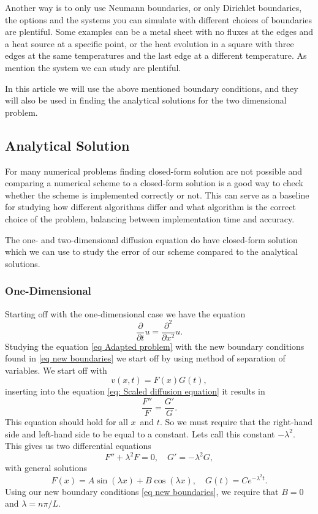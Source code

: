 \documentclass[%
reprint,
nofootinbib,
amsmath,amssymb,
aps,
]{revtex4-1}
\newcommand{\fracpt}{\frac{\partial}{\partial t}}
\newcommand{\fracpxx}{\frac{\partial^2}{\partial x^2}}
\begin{document}
Another way is to only use Neumann boundaries, or only Dirichlet boundaries, the options and the systems you can simulate with different choices of boundaries are plentiful. Some examples can be a metal sheet with no fluxes at the edges and a heat source at a specific point, or the heat evolution in a square with three edges at the same temperatures and the last edge at a different temperature. As mention the system we can study are plentiful. 

In this article we will use the above mentioned boundary conditions, and they will also be used in finding the analytical solutions for the two dimensional problem. 


\subsection{Analytical Solution}
For many numerical problems finding closed-form solution are not possible and comparing a numerical scheme to a closed-form solution is a good way to check whether the scheme is implemented correctly or not. This can serve as a baseline for studying how different algorithms differ and what algorithm is the correct choice of the problem, balancing between implementation time and accuracy. 

The one- and two-dimensional diffusion equation do have closed-form solution which we can use to study the error of our scheme compared to the analytical solutions. 
\subsubsection{One-Dimensional}
Starting off with the one-dimensional case we have the equation 
\begin{equation}
	\fracpt u = \fracpxx u. 
\end{equation}
Studying the equation \eqref{eq Adapted problem} with the new boundary conditions found in \ref{eq new boundaries} we start off by using method of separation of variables. We start off with 
\begin{equation}
	v(x,t) = F(x)G(t),
\end{equation}
inserting into the equation \eqref{eq: Scaled diffusion equation} it results in 
\begin{equation}
	\frac{F''}{F} = \frac{G'}{G}.
\end{equation}
This equation should hold for all $x$ and $t$. So we must require that the right-hand side and left-hand side to be equal to a constant. Lets call this constant $-\lambda^2$. This gives us two differential equations
\begin{equation}
	F'' + \lambda^2 F = 0, \quad G' = -\lambda^2 G,
\end{equation}
with general solutions
\begin{equation}
	F(x) = A\sin(\lambda x)+ B\cos(\lambda x), \quad G(t) = Ce^{-\lambda^2 t}.
\end{equation}
Using our new boundary conditions \eqref{eq new boundaries}, we require that $B=0$ and $\lambda = n\pi/L$. 
\end{document}
